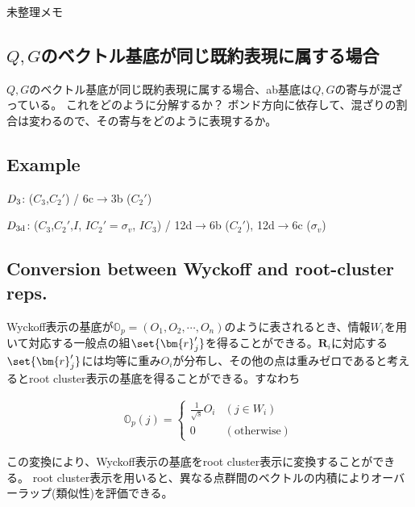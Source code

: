 \documentclass[11pt]{easymemo}
\begin{document}
\newpage

未整理メモ

\subsection{$Q,G$のベクトル基底が同じ既約表現に属する場合}

$Q,G$のベクトル基底が同じ既約表現に属する場合、ab基底は$Q,G$の寄与が混ざっている。
これをどのように分解するか？
ボンド方向に依存して、混ざりの割合は変わるので、その寄与をどのように表現するか。

\subsection{Example}

$D_{\rm 3}$: ($C_{3}$,$C_{2}'$) / 6c$\to$3b ($C_{2}'$)

$D_{\rm 3d}$: ($C_{3}$,$C_{2}'$,$I$, $IC_{2}'=\sigma_{v}$, $IC_{3}$) / 12d$\to$6b ($C_{2}'$), 12d$\to$6c ($\sigma_{v}$)


\subsection{Conversion between Wyckoff and root-cluster reps.}

Wyckoff表示の基底が$\mathbb{O}_p=(O_1,O_2,\cdots,O_n)$のように表されるとき、情報$W_i$を用いて対応する一般点の組$\set{\bm{r}_j'}$を得ることができる。$\bm{R}_i$に対応する$\set{\bm{r}_j'}$には均等に重み$O_i$が分布し、その他の点は重みゼロであると考えるとroot cluster表示の基底を得ることができる。すなわち

\begin{align}
\mathbb{O}_p(j)=
\begin{cases}
\frac{1}{\sqrt{s}}O_i & (j\in W_i) \\
0 & (\text{otherwise})
\end{cases}
\end{align}

この変換により、Wyckoff表示の基底をroot cluster表示に変換することができる。
root cluster表示を用いると、異なる点群間のベクトルの内積によりオーバーラップ(類似性)を評価できる。
\end{document}
